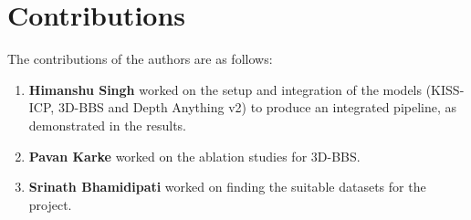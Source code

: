 \section{Contributions}
\label{sec:contributions}

The contributions of the authors are as follows:

\begin{enumerate}
    \item \textbf{Himanshu Singh} worked on the setup and integration of the models (KISS-ICP, 3D-BBS and Depth Anything v2) to produce an integrated pipeline, as demonstrated in the results.
    \item \textbf{Pavan Karke} worked on the ablation studies for 3D-BBS.
    \item \textbf{Srinath Bhamidipati} worked on finding the suitable datasets for the project.
\end{enumerate}
